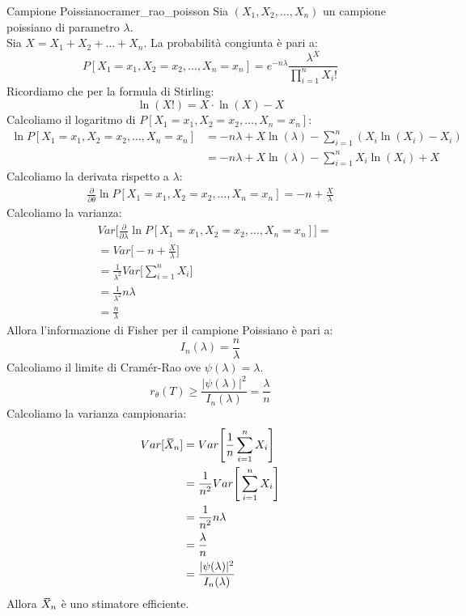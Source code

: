 \documentclass[12pt]{report}
\newcommand{\nmu}{}
\newcommand{\wbar}[1]{%
	\accentset{\mbox{\rule{0.55em}{0.5pt}}}{#1}%
}
\begin{document}
	 \begin{example}{\nmu Campione Poissiano}{cramer_rao_poisson}
	 	Sia $(X_1, X_2, \dots, X_n)$ un campione poissiano di parametro $\lambda$. \\
	 	Sia $X = X_1 + X_2 + \dots + X_n$. La probabilità congiunta è pari a:
	 	\[
	 	P[X_1 = x_1, X_2 = x_2, \dots, X_n = x_n] = e^{-n\lambda}\dfrac{\lambda^X}{\prod_{i=1}^{n}X_i!}
	 	\]
	 	Ricordiamo che per la formula di Stirling:
	 	\[
	 	\ln(X!) = X \cdot \ln(X) - X
	 	\]
	 	Calcoliamo il logaritmo di $P[X_1 = x_1, X_2 = x_2, \dots, X_n = x_n]$:
	 	\begin{align*}
	 		\ln P[X_1 = x_1, X_2 = x_2, \dots, X_n = x_n] &= -n\lambda + X\ln(\lambda) - \sum_{i=1}^{n}(X_i\ln(X_i) - X_i) \\
	 		&= -n\lambda + X\ln(\lambda) - \sum_{i=1}^{n}X_i\ln(X_i) + X
	 	\end{align*}
	 	Calcoliamo la derivata rispetto a $\lambda$:
	 	\begin{align*}
	 		\frac{\partial}{\partial\theta}\ln P[X_1 = x_1, X_2 = x_2, \dots, X_n = x_n] = -n + \frac{X}{\lambda}
	 	\end{align*}
	 	Calcoliamo la varianza:
	 	\begin{align*}
	 		& Var\Bigg[\frac{\partial}{\partial\lambda}\ln P[X_1 = x_1, X_2 = x_2, \dots, X_n = x_n]\Bigg] = \\ &= Var\Big[-n + \frac{X}{\lambda}\Big] \\
	 		&= \frac{1}{\lambda^2}Var\Bigg[\sum_{i=1}^{n}X_i\Bigg] \\
	 		&= \frac{1}{\lambda^2}n\lambda \\
	 		&= \frac{n}{\lambda}
	 	\end{align*}
	 	Allora l'informazione di Fisher per il campione Poissiano è pari a:
	 	\[
	 	I_n(\lambda) = \frac{n}{\lambda}
	 	\]
	 	Calcoliamo il limite di Cramér-Rao ove $\psi(\lambda) = \lambda$.
	 	\[
	 	r_\theta(T) \geq \frac{|\psi(\lambda)|^2}{I_n(\lambda)} = \frac{\lambda}{n}
	 	\]
	 	Calcoliamo la varianza campionaria:
	 	\begin{align*}
	 		Var[\wbar{X}_n] &= Var\Bigg[\frac{1}{n}\sum_{i=1}^{n}X_i\Bigg] \\
	 		&= \frac{1}{n^2}Var\Bigg[\sum_{i=1}^{n}X_i\Bigg] \\
	 		&= \frac{1}{n^2}n\lambda \\
	 		&= \frac{\lambda}{n} \\
	 		&= \frac{|\psi(\lambda)|^2}{I_n(\lambda)}
	 	\end{align*}
	 	Allora $\wbar{X}_n$ è uno stimatore efficiente.
	 \end{example}
\end{document}
